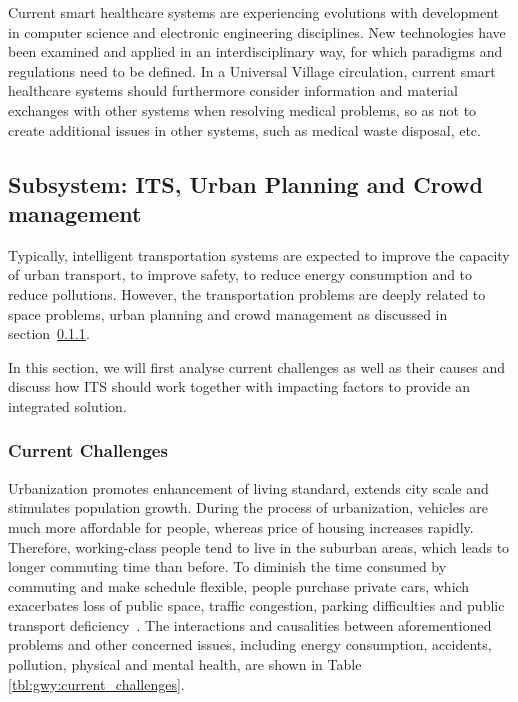 \documentclass[letterpaper, twocolumn, 10pt, conference]{IEEEtran}
\begin{document}
Current smart healthcare systems are experiencing evolutions with development in computer science and electronic engineering disciplines. New technologies have been examined and applied in an interdisciplinary way, for which paradigms and regulations need to be defined. In a Universal Village circulation, current smart healthcare systems should furthermore consider information and material exchanges with other systems when resolving medical problems, so as not to create additional issues in other systems, such as medical waste disposal, etc.


\subsection{Subsystem: ITS, Urban Planning and Crowd management} %
\label{ssec:gwy:ITS}

Typically, intelligent transportation systems are expected to improve the capacity of urban transport, to improve safety, to reduce energy consumption and to reduce pollutions. 
However, the transportation problems are deeply related to space problems, urban planning and crowd management as discussed in section~\ref{sssec:gwy:ITS:challenges}. 


In this section, we will first analyse current challenges as well as their causes and discuss how ITS should work together with impacting factors to provide an integrated solution. 

\subsubsection{Current Challenges}
\label{sssec:gwy:ITS:challenges}

Urbanization promotes enhancement of living standard, extends city scale and stimulates population growth. During the process of urbanization, vehicles are much more affordable for people, whereas price of housing increases rapidly. Therefore, working-class people tend to live in the suburban areas, which leads to longer commuting time than before. To diminish the time consumed by commuting and make schedule flexible, people purchase private cars, which exacerbates loss of public space, traffic congestion, parking difficulties and public transport deficiency~\cite{rodrigue2017geography}. The interactions and causalities between aforementioned problems and other concerned issues, including energy consumption, accidents, pollution, physical and mental health, are shown in Table \ref{tbl:gwy:current_challenges}.
\end{document}
